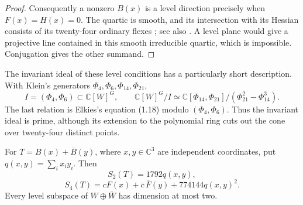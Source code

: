 \begin{proof}
Consequently a nonzero $B(x)$ is a level direction precisely when
$F(x)=H(x)=0$. The quartic is smooth, and its intersection with its Hessian consists of its twenty-four ordinary flexes
\cite[\S2.1, Proposition (i), pp.~64--65]{Elkies1999}; see also
\cite[Lemma 1.4, p.~32]{Kaneta1998}.
A level plane would give a projective line contained in this smooth irreducible quartic, which is impossible. Conjugation gives the other summand.
\end{proof}

The invariant ideal of these level conditions has a particularly short description. With Klein's generators $\Phi_4,\Phi_6,\Phi_{14},\Phi_{21}$,
\[
 I=(\Phi_4,\Phi_6)\subset\mathbb C[W]^G,
 \qquad
 \mathbb C[W]^G/I\simeq
 \mathbb C[\Phi_{14},\Phi_{21}]/(\Phi_{21}^2-\Phi_{14}^3).
\]
The last relation is Elkies's equation (1.18) modulo $(\Phi_4,\Phi_6)$.
Thus the invariant ideal is prime, although its extension to the polynomial ring cuts out the cone over twenty-four distinct points.

\begin{proposition}\label{prop:klein-mixed}
For $T=B(x)+\overline B(y)$, where $x,y\in\mathbb C^3$ are independent coordinates, put $q(x,y)=\sum_i x_i y_i$. Then
\[
 S_2(T)=1792q(x,y),
\]
\[
 S_4(T)=cF(x)+\overline c\,\overline F(y)+774144q(x,y)^2.
\]
Every level subspace of $W\oplus\overline W$ has dimension at most two.
\end{proposition}

